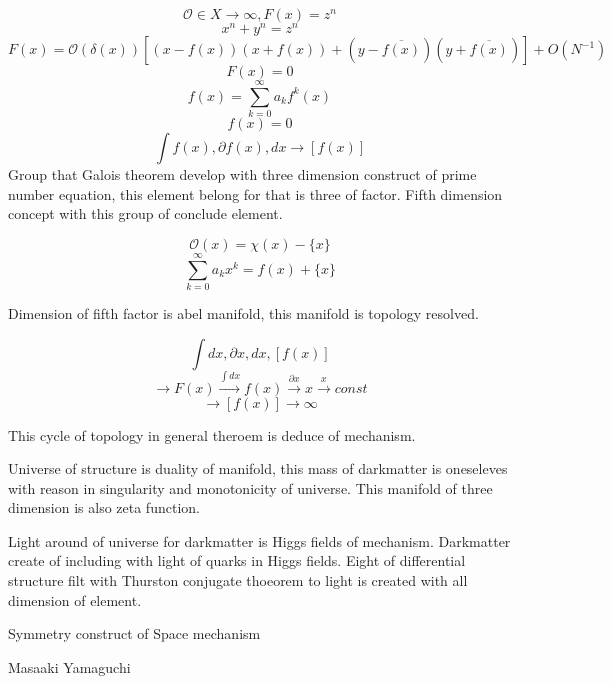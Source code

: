 \documentclass{jsarticle}
\begin{document}
  $$ \mathcal{O} \in X \to \infty , F(x) = z^n $$
  $$ x^n + y^n = z^n $$
  $$ F(x) = \mathcal{O}(\delta(x))[(x - f(x))(x + f(x)) + (y - \overline{f(x)})(y + \overline{f(x)})] + O(N^{-1}) $$
  $$ F(x) = 0 $$
  $$ f(x) = \sum^{\infty}_{k=0} a_k f^k(x) $$
  $$ f(x) = 0 $$
  $$ \int f(x) , \partial f(x) , dx \to [f(x)] $$
Group that Galois theorem develop with three dimension construct of prime number equation, this element belong for
that is three of factor. Fifth dimension concept with this group of conclude element. 

$$ \mathcal{O}(x) = \chi(x) - \{x\} $$
$$ \sum^{\infty}_{k=0} a_k x^k = f(x) + \{x\} $$

  Dimension of fifth factor is abel manifold, 
  this manifold is topology resolved.
 
  $$ \int dx, \partial x , dx , [f(x)] $$
  $$ \to F(x) \stackrel{\int dx}{\to} f(x) \stackrel{\partial x}{\to} x \stackrel{x}{\to}  const $$
  $$ \to [f(x)] \to \infty $$
  
  This cycle of topology in general theroem is deduce of mechanism.

  Universe of structure is duality of manifold, this mass of darkmatter is oneseleves with
reason in singularity and monotonicity of universe. This manifold of three dimension is also
zeta function.

  Light around of universe for darkmatter is Higgs fields of mechanism.
Darkmatter create of including with light of quarks in Higgs fields.
Eight of differential structure filt with Thurston conjugate thoeorem to
light is created with all dimension of element.

\newpage
\begin{center}
\large	Symmetry construct of Space mechanism
\end{center}
\begin{center}
	Masaaki Yamaguchi
\end{center}
\end{document}
